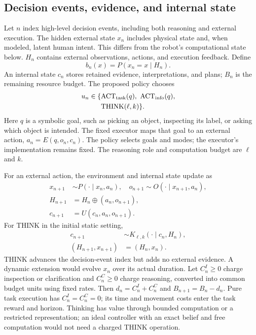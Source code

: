 \documentclass[conference]{IEEEtran}
\begin{document}
\subsection{Decision events, evidence, and internal state}
Let $n$ index high-level decision events, including both reasoning and external execution. The hidden external state $x_n$ includes physical state and, when modeled, latent human intent. This differs from the robot's computational state below. $H_n$ contains external observations, actions, and execution feedback. Define
\begin{equation}
 b_n(x)=P(x_n=x\mid H_n).
\end{equation}
An internal state $c_n$ stores retained evidence, interpretations, and plans; $B_n$ is the remaining resource budget. The proposed policy chooses
\begin{equation}
\begin{split}
u_n\in\{&\mathrm{ACT}_{\rm task}(q),\ \mathrm{ACT}_{\rm info}(q),\\
        &\mathrm{THINK}(\ell,k)\}.
\end{split}
\label{eq:actions}
\end{equation}
Here $q$ is a symbolic goal, such as picking an object, inspecting its label, or asking which object is intended. The fixed executor maps that goal to an external action, $a_n=E(q,o_n,c_n)$. The policy selects goals and modes; the executor's implementation remains fixed. The reasoning role and computation budget are $\ell$ and $k$.

For an external action, the environment and internal state update as
\begin{equation}
\begin{split}
x_{n+1}&\sim P(\cdot\mid x_n,a_n),\quad
o_{n+1}\sim O(\cdot\mid x_{n+1},a_n),\\
H_{n+1}&=H_n\oplus(a_n,o_{n+1}),\\
c_{n+1}&=U(c_n,a_n,o_{n+1}).
\end{split}
\end{equation}
For THINK in the initial static setting,
\begin{equation}
\begin{aligned}
 c_{n+1}&\sim K_{\ell,k}(\cdot\mid c_n,H_n),\\
 (H_{n+1},x_{n+1})&=(H_n,x_n).
\end{aligned}
\end{equation}
THINK advances the decision-event index but adds no external evidence. A dynamic extension would evolve $x_n$ over its actual duration. Let $C_n^I\geq0$ charge inspection or clarification and $C_n^C\geq0$ charge reasoning, converted into common budget units using fixed rates. Then $d_n=C_n^I+C_n^C$ and $B_{n+1}=B_n-d_n$. Pure task execution has $C_n^I=C_n^C=0$; its time and movement costs enter the task reward and horizon. Thinking has value through bounded computation or a restricted representation; an ideal controller with an exact belief and free computation would not need a charged THINK operation.
\end{document}
